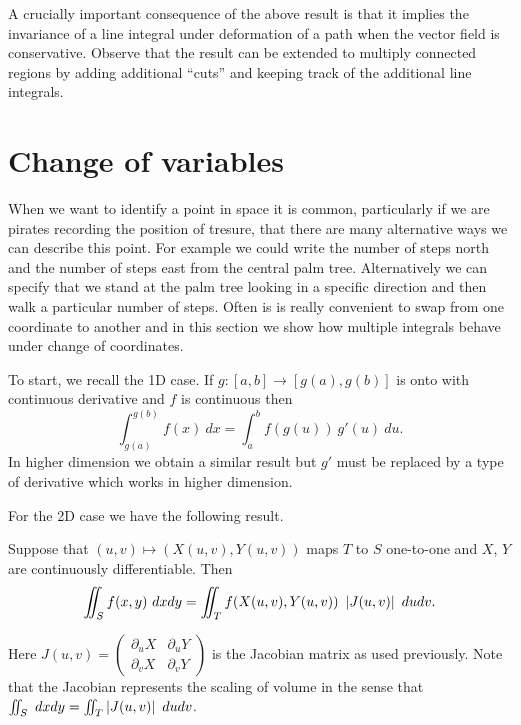 A crucially important consequence of the above result is that it implies the invariance of a line integral under deformation of a path when the vector field is conservative.
Observe that the result can be extended to multiply connected regions by adding additional ``cuts'' and keeping track of the additional line integrals.

\section{Change of variables}

When we want to identify a point in space it is common, particularly if we are pirates recording the position of tresure, that there are many alternative ways we can describe this point.
For example we could write the number of steps north and the number of steps east from the central palm tree.
Alternatively we can specify that we stand at the palm tree looking in a specific direction and then walk a particular number of steps.
Often is is really convenient to swap from one coordinate to another and in this section we show how multiple integrals behave under change of coordinates.

To start, we recall the 1D case.
If \(g : [a,b] \to [g(a),g(b)]\) is onto with continuous derivative and \(f\) is continuous then
\[
    \int_{g(a)}^{g(b)}    f(x) \ dx = \int_{a}^{b} f(g(u)) \ g'(u) \ du.
\]
In higher dimension we obtain a similar result but \(g'\) must be replaced by a type of derivative which works in higher dimension.

For the 2D case we have the following result.
\begin{theorem}%
    \label{thm:change-variable-2D}
    Suppose that \((u,v) \mapsto (X(u,v),Y(u,v))\) maps \(T\) to \(S\) one-to-one and \(X\), \(Y\) are continuously differentiable. Then
    \[
        \iint_{S} f(x,y) \ dx dy = \iint_{T} f(X(u,v),Y(u,v)) \ \left|J(u,v)\right| \ du dv.
    \]
\end{theorem}
Here \(J(u,v) = \left({\begin{smallmatrix}
        \partial_u X & \partial_u Y \\ \partial_v X & \partial_v Y
    \end{smallmatrix}}\right)\) is the Jacobian matrix as used previously.
%
Note that the Jacobian represents the scaling of volume in the sense that \(\iint_{S} \ dx dy = \iint_{T}  \left|J(u,v)\right| \ du dv \).

